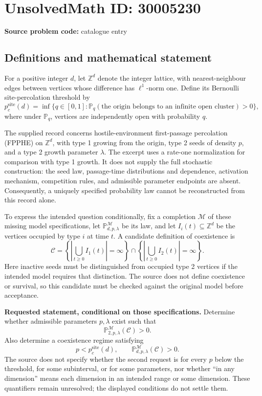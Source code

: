 \documentclass[11pt]{article}
\newcommand{\Z}{\mathbb{Z}}
\begin{document}
\section*{UnsolvedMath ID: 30005230}
\textbf{Source problem code:} catalogue entry
\subsection{Definitions and mathematical statement}
For a positive integer \(d\), let \(\Z^d\) denote the integer lattice, with nearest-neighbour edges between vertices whose difference has \(\ell^1\)-norm one. Define its Bernoulli site-percolation threshold by
\[
p_c^{\mathrm{site}}(d)=\inf\bigl\{q\in[0,1]:\mathbb P_q(\text{the origin belongs to an infinite open cluster})>0\bigr\},
\]
where under \(\mathbb P_q\), vertices are independently open with probability \(q\).

The supplied record concerns hostile-environment first-passage percolation (FPPHE) on \(\Z^d\), with type 1 growing from the origin, type 2 seeds of density \(p\), and a type 2 growth parameter \(\lambda\). The excerpt uses a rate-one normalization for comparison with type 1 growth. It does not supply the full stochastic construction: the seed law, passage-time distributions and dependence, activation mechanism, competition rules, and admissible parameter endpoints are absent. Consequently, a uniquely specified probability law cannot be reconstructed from this record alone.

To express the intended question conditionally, fix a completion \(\mathcal M\) of these missing model specifications, let \(\mathbb P^{\mathcal M}_{d,p,\lambda}\) be its law, and let \(I_i(t)\subseteq\Z^d\) be the vertices occupied by type \(i\) at time \(t\). A candidate definition of coexistence is
\[
\mathcal C=\left\{\left|\bigcup_{t\geq0}I_1(t)\right|=\infty\right\}\cap
\left\{\left|\bigcup_{t\geq0}I_2(t)\right|=\infty\right\}.
\]
Here inactive seeds must be distinguished from occupied type 2 vertices if the intended model requires that distinction. The source does not define coexistence or survival, so this candidate must be checked against the original model before acceptance.

\textbf{Requested statement, conditional on those specifications.} Determine whether admissible parameters \(p,\lambda\) exist such that
\[
\mathbb P^{\mathcal M}_{2,p,\lambda}(\mathcal C)>0.
\]
Also determine a coexistence regime satisfying
\[
p<p_c^{\mathrm{site}}(d),\qquad
\mathbb P^{\mathcal M}_{d,p,\lambda}(\mathcal C)>0.
\]
The source does not specify whether the second request is for every \(p\) below the threshold, for some subinterval, or for some parameters, nor whether ``in any dimension'' means each dimension in an intended range or some dimension. These quantifiers remain unresolved; the displayed conditions do not settle them.
\end{document}
